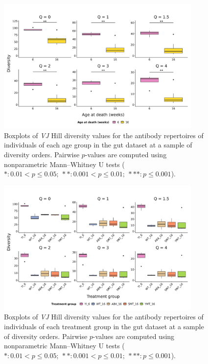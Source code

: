 \begin{figure}
\centering
\includegraphics[width = 0.9\textwidth]{_Figures/png/igseq-gut-VJ-diversity-solo-age}
\caption{Boxplots of \textit{VJ} Hill diversity values for the antibody repertoires of individuals of each age group in the \igseq gut dataset at a sample of diversity orders. Pairwise $p$-values are computed using nonparametric Mann–Whitney U tests ($*: 0.01 < p \leq 0.05;~**: 0.001 < p \leq 0.01;~***: p \leq 0.001$).}
\label{fig:igseq-gut-VJ-diversity-solo-age}
\end{figure}

\begin{figure}
\centering
\includegraphics[width = 0.9\textwidth]{_Figures/png/igseq-gut-VJ-diversity-solo-groups}
\caption{Boxplots of \textit{VJ} Hill diversity values for the antibody repertoires of individuals of each treatment group in the \igseq gut dataset at a sample of diversity orders. Pairwise $p$-values are computed using nonparametric Mann–Whitney U tests ($*: 0.01 < p \leq 0.05;~**: 0.001 < p \leq 0.01;~***: p \leq 0.001$).}
\label{fig:igseq-gut-VJ-diversity-solo-groups}
\end{figure}


